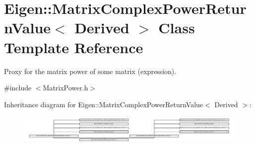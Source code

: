 \hypertarget{class_eigen_1_1_matrix_complex_power_return_value}{}\section{Eigen\+:\+:Matrix\+Complex\+Power\+Return\+Value$<$ Derived $>$ Class Template Reference}
\label{class_eigen_1_1_matrix_complex_power_return_value}


Proxy for the matrix power of some matrix (expression).  




{\ttfamily \#include $<$Matrix\+Power.\+h$>$}

Inheritance diagram for Eigen\+:\+:Matrix\+Complex\+Power\+Return\+Value$<$ Derived $>$\+:\begin{figure}[H]
\begin{center}
\leavevmode
\includegraphics[height=1.443299cm]{class_eigen_1_1_matrix_complex_power_return_value}
\end{center}
\end{figure}
